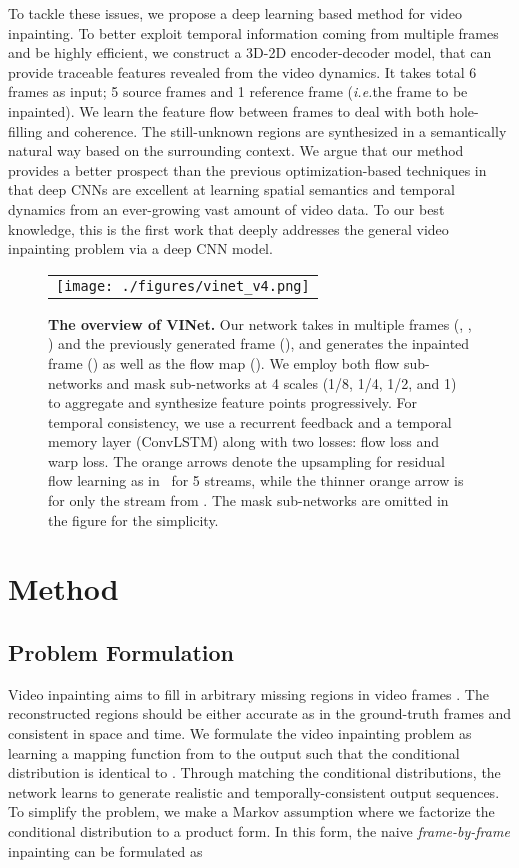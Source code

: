 \documentclass[10pt,twocolumn,letterpaper]{article}
\renewcommand{\ie}{\textit{i.e.}}
\begin{document}
To tackle these issues, we propose a deep learning based method for video inpainting. To better exploit temporal information coming from multiple frames and be highly efficient, we construct a 3D-2D encoder-decoder model, that can provide traceable features revealed from the video dynamics. It takes total 6 frames as input; 5 source frames and 1 reference frame (\ie the frame to be inpainted). We learn the feature flow between frames to deal with both hole-filling and coherence. The still-unknown regions are synthesized in a semantically natural way based on the surrounding context. We argue that our method provides a better prospect than the previous optimization-based techniques in that deep CNNs are excellent at learning spatial semantics and temporal dynamics from an ever-growing vast amount of video data. To our best knowledge, this is the first work that deeply addresses the general video inpainting problem via a deep CNN model.



\begin{figure*}[t]
\begin{tabular}{@{}c@{}}
\texttt{[image: ./figures/vinet\_v4.png]} \\
\end{tabular}
\caption{ {\bf The overview of VINet.} Our network takes in multiple frames (, , ) and the previously generated frame (), and generates the inpainted frame () as well as the flow map (). We employ both flow sub-networks and mask sub-networks at 4 scales (1/8, 1/4, 1/2, and 1) to aggregate and synthesize feature points progressively. For temporal consistency, we use a recurrent feedback and a temporal memory layer (ConvLSTM) along with two losses: flow loss and warp loss. The orange arrows denote the  upsampling for residual flow learning as in~\cite{sun2018pwc} for 5 streams, while the thinner orange arrow is for only the stream from . The mask sub-networks are omitted in the figure for the simplicity.}
\label{fig:architecture}
\end{figure*}


\section{Method}
\label{sec:method}


\subsection{Problem Formulation}
Video inpainting aims to fill in arbitrary missing regions in video frames . The reconstructed regions should be either accurate as in the ground-truth frames  and consistent in space and time. We formulate the video inpainting problem as learning a mapping function from  to the output  such that the conditional distribution  is identical to . Through matching the conditional distributions, the network learns to generate realistic and temporally-consistent output sequences. To simplify the problem, we make a Markov assumption where we factorize the conditional distribution to a product form. In this form, the naive \textit{frame-by-frame} inpainting can be formulated as
\end{document}
